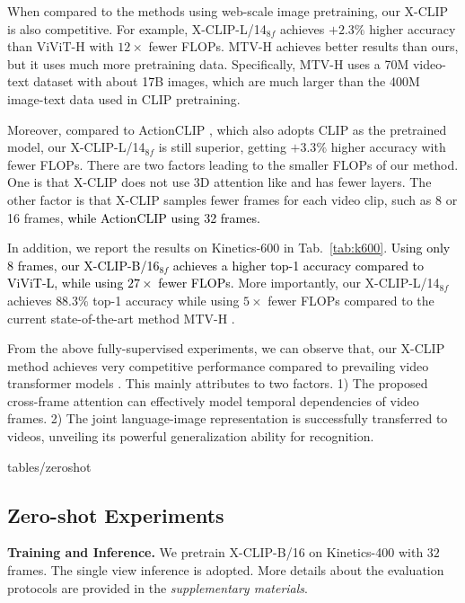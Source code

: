 \documentclass[runningheads]{llncs}
\begin{document}
When compared to the methods using web-scale image pretraining, our X-CLIP is also competitive. For example, X-CLIP-L/14$_{8f}$ achieves $+2.3\%$ higher accuracy than ViViT-H \cite{arnab2021vivit} with $12\times$ fewer FLOPs. MTV-H \cite{yan2022multiview} achieves better results than ours, but it uses much more pretraining data. Specifically, MTV-H uses a 70M video-text dataset with about \textcolor{black}{17}B images, which are much larger than the 400M image-text data used in CLIP pretraining.

Moreover, compared to ActionCLIP \cite{wang2021actionclip}, which also adopts CLIP as the pretrained model, our X-CLIP-L/14$_{8f}$ is still superior, getting $+3.3\%$ higher accuracy with fewer FLOPs. There are two factors leading to the smaller FLOPs of our method. One is that X-CLIP does not use 3D attention like \cite{liu2021video} and has fewer layers. The other factor is that X-CLIP samples fewer frames for each video clip, such as 8 or 16 frames, \textcolor{black}{while ActionCLIP \cite{wang2021actionclip} using 32 frames.}

In addition, we report the results on Kinetics-600 in Tab.~\ref{tab:k600}. \textcolor{black}{Using only $8$ frames, our X-CLIP-B/16$_{8f}$ achieves a higher top-1 accuracy compared to ViViT-L, while using $27\times$ fewer FLOPs.}
More importantly, our X-CLIP-L/14$_{8f}$ achieves $88.3\%$ top-1 accuracy while using $5 \times$ fewer FLOPs compared to the current state-of-the-art method MTV-H \cite{yan2022multiview}. 

From the above fully-supervised experiments, we can observe that, our X-CLIP method achieves very competitive performance compared to prevailing video transformer models \cite{zhang2021co,florence,yan2022multiview,wang2021actionclip,ju2021prompting}. %
This mainly attributes to two factors.
1) The proposed cross-frame attention can effectively model temporal dependencies of video frames. 2) The joint language-image representation is successfully transferred to videos, unveiling its powerful generalization ability for recognition. 

{tables/zeroshot}
\subsection{Zero-shot Experiments} \label{sec:zero-shot}

\textbf{Training and Inference.} We pretrain X-CLIP-B/16 on Kinetics-400 with $32$ frames. The single view inference is adopted. More details about the evaluation protocols are provided in the \emph{supplementary materials}. 
\end{document}
